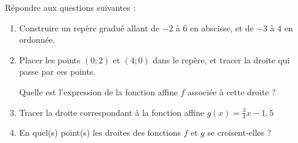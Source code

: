 \documentclass{beamer}
\begin{document}
\begin{frame}
	Répondre aux questions suivantes :
	\begin{enumerate}
		\item Construire un repère gradué allant de $-2$ à $6$ en abscisse, et de $-3$ à $4$ en ordonnée.
		\item Placer les points $(0 ; 2)$ et $(4 ; 0)$ dans le repère, et tracer la droite qui passe par ces points.

		      Quelle est l'expression de la fonction affine $f$ associée à cette droite ?
		\item Tracer la droite correspondant à la fonction affine $g(x) = \frac{3}{4}x - 1,5$
		\item En quel(s) point(s) les droites des fonctions $f$ et $g$ se croisent-elles ?
	\end{enumerate}
\end{frame}

\begin{frame}
	\begin{center}
	\end{center}
\end{frame}
\end{document}
